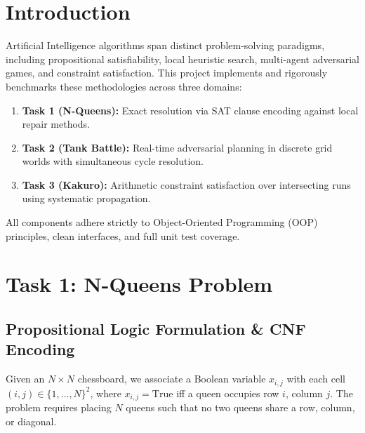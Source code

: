 \documentclass[conference]{IEEEtran}
\begin{document}
\section{Introduction}
Artificial Intelligence algorithms span distinct problem-solving paradigms, including propositional satisfiability, local heuristic search, multi-agent adversarial games, and constraint satisfaction. This project implements and rigorously benchmarks these methodologies across three domains:
\begin{enumerate}
    \item \textbf{Task 1 (N-Queens):} Exact resolution via SAT clause encoding against local repair methods.
    \item \textbf{Task 2 (Tank Battle):} Real-time adversarial planning in discrete grid worlds with simultaneous cycle resolution.
    \item \textbf{Task 3 (Kakuro):} Arithmetic constraint satisfaction over intersecting runs using systematic propagation.
\end{enumerate}

All components adhere strictly to Object-Oriented Programming (OOP) principles, clean interfaces, and full unit test coverage.

\section{Task 1: N-Queens Problem}

\subsection{Propositional Logic Formulation \& CNF Encoding}
Given an $N \times N$ chessboard, we associate a Boolean variable $x_{i,j}$ with each cell $(i, j) \in \{1, \dots, N\}^2$, where $x_{i,j} = \text{True}$ iff a queen occupies row $i$, column $j$. The problem requires placing $N$ queens such that no two queens share a row, column, or diagonal.
\end{document}
